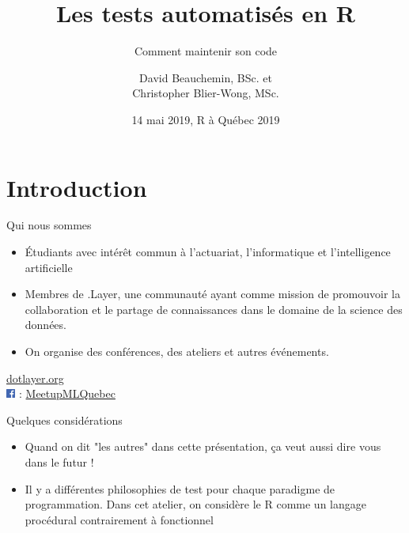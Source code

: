 \documentclass[11pt]{beamer}
\title[Les tests automatisés en R]{Les tests automatisés en R}
\subtitle{Comment maintenir son code}
\author[D. Beauchemin \& C. Blier-Wong]{David Beauchemin, BSc. et \\ Christopher Blier-Wong, MSc.}
\institute[.Layer]
{
	.Layer, Université Laval, CRDM, GRAAL
}
\date{14 mai 2019, R à Québec 2019}
\begin{document}
\begin{frame}[label=titre, plain]
\titlepage
\end{frame}

\section[Introduction]{Introduction}

\begin{frame}{Qui nous sommes}
\begin{itemize}
	\item Étudiants avec intérêt commun à l'actuariat, l'informatique et l'intelligence artificielle
	\item Membres de .Layer, une communauté ayant comme mission de promouvoir la collaboration et le partage de connaissances dans le domaine de la science des données.
	\item On organise des conférences, des ateliers et autres événements. 
\end{itemize}
\begin{center}
	\href{dotlayer.org}{dotlayer.org}\\
	\includegraphics[height = 0.3cm]{facebook} : \href{https://www.facebook.com/MeetupMLQuebec/}{MeetupMLQuebec}
\end{center}
\end{frame}

\begin{frame}{Quelques considérations}
\begin{itemize}
\item Quand on dit "les autres" dans cette présentation, ça veut aussi dire vous dans le futur !
\item Il y a différentes philosophies de test pour chaque paradigme de programmation. Dans cet atelier, on considère le \textsf{R} comme un langage procédural contrairement à fonctionnel
\end{itemize}
\end{frame}
\end{document}
